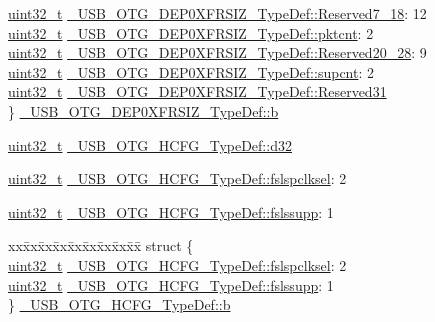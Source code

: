 \begin{DoxyCompactItemize}
\begin{tabbing}
\>\hyperlink{stdint_8h_a435d1572bf3f880d55459d9805097f62}{uint32\_t} \hyperlink{group___u_s_b___o_t_g___d_r_i_v_e_r_ga709b318e2fe53d1ccbbb6a274f7cdf9b}{\_USB\_OTG\_DEP0XFRSIZ\_TypeDef::Reserved7\_18}: 12\\
\>\hyperlink{stdint_8h_a435d1572bf3f880d55459d9805097f62}{uint32\_t} \hyperlink{group___u_s_b___o_t_g___d_r_i_v_e_r_ga903035f15b46865c694e6f28bceb81d6}{\_USB\_OTG\_DEP0XFRSIZ\_TypeDef::pktcnt}: 2\\
\>\hyperlink{stdint_8h_a435d1572bf3f880d55459d9805097f62}{uint32\_t} \hyperlink{group___u_s_b___o_t_g___d_r_i_v_e_r_ga23f2271c3de7c9cc663775ed61507f29}{\_USB\_OTG\_DEP0XFRSIZ\_TypeDef::Reserved20\_28}: 9\\
\>\hyperlink{stdint_8h_a435d1572bf3f880d55459d9805097f62}{uint32\_t} \hyperlink{group___u_s_b___o_t_g___d_r_i_v_e_r_ga102cb1f6b08dacfa40ee191b386a42e1}{\_USB\_OTG\_DEP0XFRSIZ\_TypeDef::supcnt}: 2\\
\>\hyperlink{stdint_8h_a435d1572bf3f880d55459d9805097f62}{uint32\_t} \hyperlink{group___u_s_b___o_t_g___d_r_i_v_e_r_ga6d6ad8f751aee7074cdbce99708c75b6}{\_USB\_OTG\_DEP0XFRSIZ\_TypeDef::Reserved31}\\
\} \hyperlink{group___u_s_b___o_t_g___d_r_i_v_e_r_ga8b05bc8e548328734af4179f180c5b07}{\_USB\_OTG\_DEP0XFRSIZ\_TypeDef::b}\\

\end{tabbing}\item 
\hyperlink{stdint_8h_a435d1572bf3f880d55459d9805097f62}{uint32\-\_\-t} \hyperlink{group___u_s_b___o_t_g___d_r_i_v_e_r_gacb1cab2cc5eb22cbf50cddd4c5409015}{\-\_\-\-U\-S\-B\-\_\-\-O\-T\-G\-\_\-\-H\-C\-F\-G\-\_\-\-Type\-Def\-::d32}
\item 
\hyperlink{stdint_8h_a435d1572bf3f880d55459d9805097f62}{uint32\-\_\-t} \hyperlink{group___u_s_b___o_t_g___d_r_i_v_e_r_ga7af45d13cc9d2b0911a4519f2285e480}{\-\_\-\-U\-S\-B\-\_\-\-O\-T\-G\-\_\-\-H\-C\-F\-G\-\_\-\-Type\-Def\-::fslspclksel}\-: 2
\item 
\hyperlink{stdint_8h_a435d1572bf3f880d55459d9805097f62}{uint32\-\_\-t} \hyperlink{group___u_s_b___o_t_g___d_r_i_v_e_r_ga18cb42f24eb7ab51021d52bbfe6ca281}{\-\_\-\-U\-S\-B\-\_\-\-O\-T\-G\-\_\-\-H\-C\-F\-G\-\_\-\-Type\-Def\-::fslssupp}\-: 1
\item 
\begin{tabbing}
xx\=xx\=xx\=xx\=xx\=xx\=xx\=xx\=xx\=\kill
struct \{\\
\>\hyperlink{stdint_8h_a435d1572bf3f880d55459d9805097f62}{uint32\_t} \hyperlink{group___u_s_b___o_t_g___d_r_i_v_e_r_ga7af45d13cc9d2b0911a4519f2285e480}{\_USB\_OTG\_HCFG\_TypeDef::fslspclksel}: 2\\
\>\hyperlink{stdint_8h_a435d1572bf3f880d55459d9805097f62}{uint32\_t} \hyperlink{group___u_s_b___o_t_g___d_r_i_v_e_r_ga18cb42f24eb7ab51021d52bbfe6ca281}{\_USB\_OTG\_HCFG\_TypeDef::fslssupp}: 1\\
\} \hyperlink{group___u_s_b___o_t_g___d_r_i_v_e_r_ga420c63f8a9ec0774dee5fb987abf3375}{\_USB\_OTG\_HCFG\_TypeDef::b}\\


\end{tabbing}
\end{DoxyCompactItemize}
